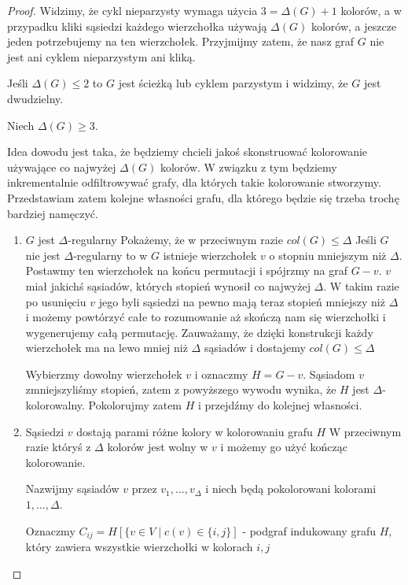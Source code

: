\begin{proof}
	Widzimy, że cykl nieparzysty wymaga użycia \(3 = \Delta(G) + 1\) kolorów,
	a w przypadku kliki sąsiedzi każdego wierzchołka używają \(\Delta(G)\) kolorów, a jeszcze jeden potrzebujemy na ten wierzchołek. Przyjmijmy zatem, że nasz graf \(G\) nie jest
	ani cyklem nieparzystym ani kliką.

	Jeśli \(\Delta(G) \leq 2\) to \(G\) jest ścieżką lub cyklem parzystym i widzimy, że \(G\) jest dwudzielny.

	Niech \(\Delta(G) \geq 3\).

	Idea dowodu jest taka, że będziemy chcieli jakoś skonstruować kolorowanie używające co najwyżej \(\Delta(G)\) kolorów. W związku z tym będziemy inkrementalnie odfiltrowywać grafy, dla których takie kolorowanie stworzymy.
	Przedstawiam zatem kolejne własności grafu, dla którego będzie się trzeba trochę bardziej namęczyć.

	\begin{enumerate}
		\item \(G\) jest \(\Delta\)-regularny
		      Pokażemy, że w przeciwnym razie \(col(G) \leq \Delta\)
		      Jeśli \(G\) nie jest \(\Delta\)-regularny to w \(G\) istnieje wierzchołek \(v\) o stopniu mniejszym niż \(\Delta\).
		      Postawmy ten wierzchołek na końcu permutacji i spójrzmy na graf \(G - v\).
		      \(v\) miał jakichś sąsiadów, których stopień wynosił co najwyżej \(\Delta\).
		      W takim razie po usunięciu \(v\) jego byli sąsiedzi na pewno mają teraz stopień mniejszy niż \(\Delta\)
		      i możemy powtórzyć całe to rozumowanie aż skończą nam się wierzchołki i wygenerujemy całą permutację.
		      Zauważamy, że dzięki konstrukcji każdy wierzchołek ma na lewo mniej niż \(\Delta\) sąsiadów i dostajemy \(col(G) \leq \Delta\)

		      Wybierzmy dowolny wierzchołek \(v\) i oznaczmy \(H = G - v\).
		      Sąsiadom \(v\) zmniejszyliśmy stopień, zatem z powyższego wywodu wynika, że \(H\) jest \(\Delta\)-kolorowalny.
		      Pokolorujmy zatem \(H\) i przejdźmy do kolejnej własności.

		\item Sąsiedzi \(v\) dostają parami różne kolory w kolorowaniu grafu \(H\)
		      W przeciwnym razie któryś z \(\Delta\) kolorów jest wolny w \(v\) i możemy go użyć kończąc kolorowanie.

		      Nazwijmy sąsiadów \(v\) przez \(v_1, ..., v_\Delta\) i niech będą pokolorowani kolorami \(1, ..., \Delta\).

		      Oznaczmy \(C_{ij} = H[\{v \in V \mid c(v) \in \{i, j\}]\) - podgraf indukowany
		      grafu \(H\), który zawiera wszystkie wierzchołki w kolorach \(i, j\)


\end{enumerate}
\end{proof}
